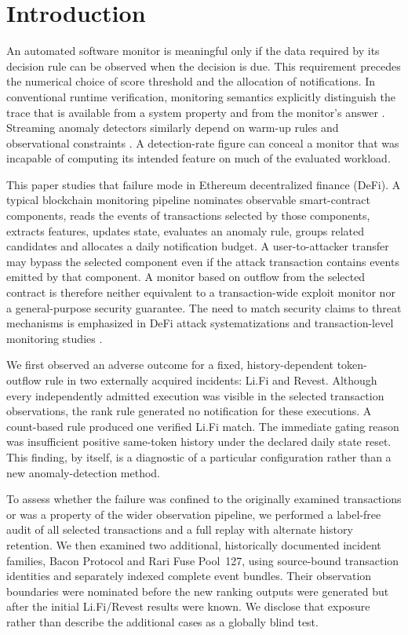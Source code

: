 \documentclass[preprint,12pt,authoryear]{elsarticle}
\begin{document}
\section{Introduction}\label{sec:intro}

An automated software monitor is meaningful only if the data required by its decision rule can be observed when the decision is due. This requirement precedes the numerical choice of score threshold and the allocation of notifications. In conventional runtime verification, monitoring semantics explicitly distinguish the trace that is available from a system property and from the monitor's answer \citep{Leucker2009RV,Bauer2011RV}. Streaming anomaly detectors similarly depend on warm-up rules and observational constraints \citep{Lavin2015NAB}. A detection-rate figure can conceal a monitor that was incapable of computing its intended feature on much of the evaluated workload.

This paper studies that failure mode in Ethereum decentralized finance (DeFi). A typical blockchain monitoring pipeline nominates observable smart-contract components, reads the events of transactions selected by those components, extracts features, updates state, evaluates an anomaly rule, groups related candidates and allocates a daily notification budget. A user-to-attacker transfer may bypass the selected component even if the attack transaction contains events emitted by that component. A monitor based on outflow from the selected contract is therefore neither equivalent to a transaction-wide exploit monitor nor a general-purpose security guarantee. The need to match security claims to threat mechanisms is emphasized in DeFi attack systematizations and transaction-level monitoring studies \citep{Zhou2023SoKDeFi,Wu2024DeFiRanger,Meng2026Houston}.

We first observed an adverse outcome for a fixed, history-dependent token-outflow rule in two externally acquired incidents: Li.Fi and Revest. Although every independently admitted execution was visible in the selected transaction observations, the rank rule generated no notification for these executions. A count-based rule produced one verified Li.Fi match. The immediate gating reason was insufficient positive same-token history under the declared daily state reset. This finding, by itself, is a diagnostic of a particular configuration rather than a new anomaly-detection method.

To assess whether the failure was confined to the originally examined transactions or was a property of the wider observation pipeline, we performed a label-free audit of all selected transactions and a full replay with alternate history retention. We then examined two additional, historically documented incident families, Bacon Protocol and Rari Fuse Pool~127, using source-bound transaction identities and separately indexed complete event bundles. Their observation boundaries were nominated before the new ranking outputs were generated but after the initial Li.Fi/Revest results were known. We disclose that exposure rather than describe the additional cases as a globally blind test.
\end{document}

